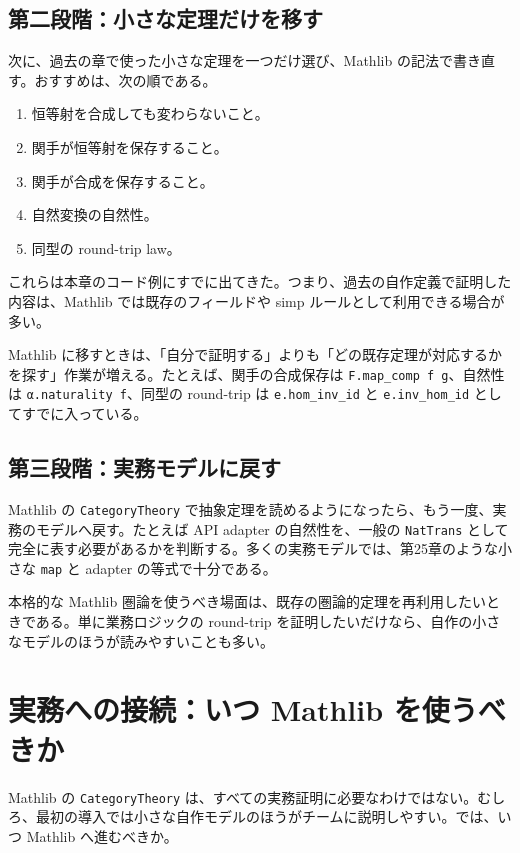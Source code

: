 \subsection{第二段階：小さな定理だけを移す}

次に、過去の章で使った小さな定理を一つだけ選び、Mathlib の記法で書き直す。おすすめは、次の順である。

\begin{enumerate}
\item 恒等射を合成しても変わらないこと。
\item 関手が恒等射を保存すること。
\item 関手が合成を保存すること。
\item 自然変換の自然性。
\item 同型の round-trip law。
\end{enumerate}

これらは本章のコード例にすでに出てきた。つまり、過去の自作定義で証明した内容は、Mathlib では既存のフィールドや simp ルールとして利用できる場合が多い。

\begin{leanbox}
Mathlib に移すときは、「自分で証明する」よりも「どの既存定理が対応するかを探す」作業が増える。たとえば、関手の合成保存は \texttt{F.map\_comp f g}、自然性は \texttt{α.naturality f}、同型の round-trip は \texttt{e.hom\_inv\_id} と \texttt{e.inv\_hom\_id} としてすでに入っている。
\end{leanbox}

\subsection{第三段階：実務モデルに戻す}

Mathlib の \texttt{CategoryTheory} で抽象定理を読めるようになったら、もう一度、実務のモデルへ戻す。たとえば API adapter の自然性を、一般の \texttt{NatTrans} として完全に表す必要があるかを判断する。多くの実務モデルでは、第25章のような小さな \texttt{map} と adapter の等式で十分である。

本格的な Mathlib 圏論を使うべき場面は、既存の圏論的定理を再利用したいときである。単に業務ロジックの round-trip を証明したいだけなら、自作の小さなモデルのほうが読みやすいことも多い。

\section{実務への接続：いつ Mathlib を使うべきか}

Mathlib の \texttt{CategoryTheory} は、すべての実務証明に必要なわけではない。むしろ、最初の導入では小さな自作モデルのほうがチームに説明しやすい。では、いつ Mathlib へ進むべきか。

